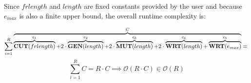 \documentclass[12pt]{article}
\begin{document}
\begin{enumerate}
		Since $frlength$ and $length$ are fixed constants provided by the user and because $e_{max}$ is
		also a finite upper bound, the overall runtime complexity is:

		\begin{equation*}
			\sum_{i=1}^{R}   \overbrace{\overbrace{\mathbf{CUT}(frlength)}^{c_{1}}  + 2 \cdot \overbrace{\mathbf{GEN}(length)}^{c_{2}}  + 2 \cdot \overbrace{\mathbf{MUT}(length)}^{c_{3}}  + 2 \cdot \overbrace{\mathbf{WRT}(length)}^{c_{4}}  + \overbrace{\mathbf{WRT}(e_{max})}^{c_{5}}}^{C} = \\
		\end{equation*}
		\begin{equation*}
			\sum_{i=1}^{R} C = R \cdot C \implies \mathcal{O}(R \cdot C) \in \mathcal{O}(R)
		\end{equation*}


\end{enumerate}
\end{document}
